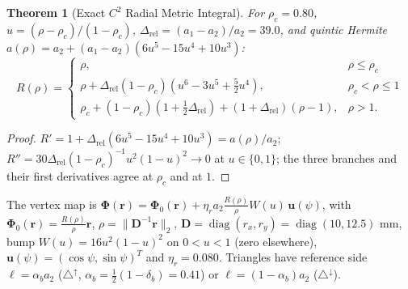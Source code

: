 \documentclass[11pt,a4paper]{article}
\newtheorem{theorem}{Theorem}[section]
\theoremstyle{definition}
\theoremstyle{remark}
\begin{document}
\begin{theorem}[Exact $C^2$ Radial Metric Integral]\label{thm:radial}
For $\rho_c = 0.80$, $u = (\rho-\rho_c)/(1-\rho_c)$, $\Delta_{\text{rel}} = (a_1-a_2)/a_2 = 39.0$, and quintic Hermite $a(\rho) = a_2 + (a_1-a_2)(6u^5-15u^4+10u^3)$:
\begin{equation}
R(\rho) = \begin{cases}
\rho, & \rho \le \rho_c\\
\rho + \Delta_{\text{rel}}(1-\rho_c)(u^6 - 3u^5 + \tfrac{5}{2}u^4), & \rho_c<\rho\le 1\\
\rho_c + (1-\rho_c)(1+\tfrac12\Delta_{\text{rel}}) + (1+\Delta_{\text{rel}})(\rho-1), & \rho>1.
\end{cases}
\end{equation}
\end{theorem}
\begin{proof}
$R' = 1 + \Delta_{\text{rel}}(6u^5-15u^4+10u^3) = a(\rho)/a_2$; $R'' = 30\Delta_{\text{rel}}(1-\rho_c)^{-1}u^2(1-u)^2\to 0$ at $u\in\{0,1\}$; the three branches and their first derivatives agree at $\rho_c$ and at $1$.
\end{proof}

The vertex map is $\mathbf{\Phi}(\mathbf{r}) = \mathbf{\Phi}_0(\mathbf{r}) + \eta_r a_2 \frac{R(\rho)}{\rho}W(u)\,\mathbf{u}(\psi)$, with $\mathbf{\Phi}_0(\mathbf{r}) = \frac{R(\rho)}{\rho}\mathbf{r}$, $\rho = \|\mathbf{D}^{-1}\mathbf{r}\|_2$, $\mathbf{D} = \operatorname{diag}(r_x,r_y) = \operatorname{diag}(10,12.5)$ mm, bump $W(u) = 16u^2(1-u)^2$ on $0<u<1$ (zero elsewhere), $\mathbf{u}(\psi) = (\cos\psi,\sin\psi)^T$ and $\eta_r = 0.080$. Triangles have reference side $\ell = \alpha_b a_2$ ($\triangle^{\uparrow}$, $\alpha_b = \tfrac12(1-\delta_b) = 0.41$) or $\ell = (1-\alpha_b)a_2$ ($\triangle^{\downarrow}$).
\end{document}
